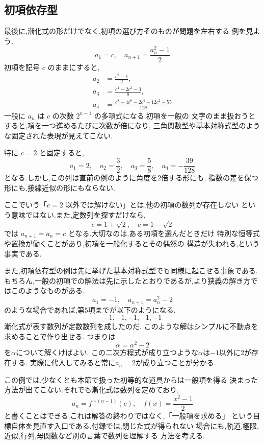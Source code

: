 \subsection{初項依存型}

最後に,漸化式の形だけでなく,初項の選び方そのものが問題を左右する
例を見よう.
\[
  a_1=c,
  \quad
  a_{n+1}=\frac{a_n^2-1}{2}
\]
初項を記号 $c$ のままにすると,
\begin{align*}
  a_2&=\frac{c^2-1}{2},\\
  a_3&=\frac{c^4-2c^2-3}{8},\\
  a_4&=\frac{c^8-4c^6-2c^4+12c^2-55}{128}
\end{align*}
一般に $a_n$ は $c$ の次数 $2^{n-1}$ の多項式になる.初項を一般の
文字のまま扱おうとすると,項を一つ進めるたびに次数が倍になり,
三角関数型や基本対称式型のような固定された表現が見えてこない.

特に $c=2$ と固定すると,
\[
  a_1=2,
  \quad
  a_2=\frac{3}{2},
  \quad
  a_3=\frac{5}{8},
  \quad
  a_4=-\frac{39}{128}
\]
となる.しかし,この列は直前の例のように角度を2倍する形にも,
指数の差を保つ形にも,接線近似の形にもならない.

ここでいう「$c=2$ 以外では解けない」とは,他の初項の数列が存在しない
という意味ではない.また,定数列を探すだけなら,
\[
  c=1+\sqrt{2},
  \quad
  c=1-\sqrt{2}
\]
では $a_{n+1}=a_n=c$ となる.大切なのは,ある初項を選んだときだけ
特別な恒等式や置換が働くことがあり,初項を一般化するとその偶然の
構造が失われる,という事実である.

また,初項依存型の例は先に挙げた基本対称式型でも同様に起こせる事象である.
もちろん,一般の初項での解法は先に示したとおりであるが,より狭義の解き方ではこのようなものがある.
\[
  a_1=-1,\quad a_{n+1}=a_n^2-2
\]
のような場合であれば,第5項までが以下のようになる.
\[
  -1,-1,-1,-1,-1
\]
漸化式が表す数列が定数数列を成したのだ.
このような解はシンプルに不動点を求めることで作り出せる.
つまりは
\[
  \alpha=\alpha^2-2
\]
を$\alpha$について解くけばよい.
この二次方程式が成り立つような$\alpha$は$-1$以外に2が存在する.
実際に代入してみると常に$a_n=2$が成り立つことが分かる.

この例では,少なくとも本節で扱った初等的な道具からは一般項を得る
決まった方法が出てこない.それでも漸化式は数列を定めており,
\[
  a_n=f^{\,\circ(n-1)}(c),
  \quad
  f(x)=\frac{x^2-1}{2}
\]
と書くことはできる.これは解答の終わりではなく,「一般項を求める」
という目標自体を見直す入口である.付録では,閉じた式が得られない
場合にも,軌道,極限,近似,行列,母関数など別の言葉で数列を理解する
方法を考える.
